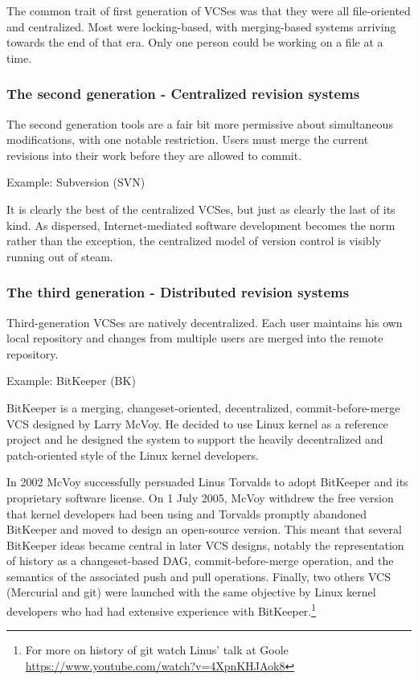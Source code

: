 \documentclass{article}
\begin{document}
The common trait of first generation of VCSes was that they were all
file-oriented and centralized. Most were locking-based, with
merging-based systems arriving towards the end of that era. Only one
person could be working on a file at a time. 

\subsubsection*{The second generation - Centralized revision systems}

The second generation tools are a fair bit more permissive about
simultaneous modifications, with one notable restriction. Users must
merge the current revisions into their work before they are allowed to
commit. 

Example: Subversion (SVN)

It is clearly the best of the centralized VCSes, but just as clearly
the last of its kind. As dispersed, Internet-mediated software
development becomes the norm rather than the exception, the
centralized model of version control is visibly running out of steam.

\subsubsection*{The third generation - Distributed revision systems}

Third-generation VCSes are natively decentralized. Each user maintains
his own local repository and changes from multiple users are merged 
into the remote repository.

Example: BitKeeper (BK)

BitKeeper is a merging, changeset-oriented, decentralized,
commit-before-merge VCS designed by Larry McVoy.
He decided to use Linux kernel as a reference project and he designed
the system to support the heavily decentralized and patch-oriented
style of the Linux kernel developers.

In 2002 McVoy successfully persuaded Linus Torvalds to adopt BitKeeper
and its proprietary software license. On 1 July 2005,
McVoy withdrew the free version that kernel developers had
been using and Torvalds promptly abandoned BitKeeper and moved
to design an open-source version. This meant that several BitKeeper
ideas became central in later VCS designs, notably the
representation of history as a changeset-based DAG,
commit-before-merge operation, and the semantics of the associated
push and pull operations.
Finally, two others VCS (Mercurial and git) were launched with
the same objective by Linux kernel developers who had had extensive
experience with BitKeeper.\footnote{For more on history of git watch
  Linus' talk at Goole \url{https://www.youtube.com/watch?v=4XpnKHJAok8}}
\end{document}
